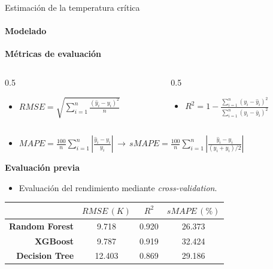 \documentclass{beamer}
\begin{document}
\begin{frame}{\LARGE Estimación de la temperatura crítica}
    \framesubtitle{Modelado}
    \textbf{Métricas de evaluación}
    \begin{columns}[T]
            \begin{column}{0.5\textwidth}
                \begin{itemize}
                    \item $RMSE=\sqrt{\sum_{i=1}^n \frac{(\hat{y}_i-y_i)^2}{n}}$ 
                \end{itemize}
            \end{column}

            \begin{column}{0.5\textwidth}
                \begin{itemize}
                    \item $R^2=1-\frac{\sum_{i=1}^n (y_i-\hat{y}_i)^2}{\sum_{i=1}^n (y_i-\bar{y}_i)^2}$
                \end{itemize}
            \end{column}
    \end{columns}
    \vspace{0.5cm}
    \begin{itemize}
        \item $MAPE=\frac{100}{n} \sum_{i=1}^n \left|\frac{\hat{y}_i-y_i}{y_i}\right| \, \rightarrow \, sMAPE=\frac{100}{n} \sum_{i=1}^n \left|\frac{\hat{y}_i-y_i}{(\hat{y}_i+y_i)/2}\right|$
    \end{itemize}

    \vspace{1cm}

    \textbf{Evaluación previa}
    \begin{itemize}
        \item Evaluación del rendimiento mediante \textit{cross-validation}.
    \end{itemize}
    \begin{table}[H]
        \centering
        \begin{tabular}{r|c|c|c}
                                & \textbf{$RMSE\,(K)$} & \textbf{$R^2$} & \textbf{$sMAPE\,(\%)$} \\ \hline
            \textbf{Random Forest} & 9.718           & 0.920          & 26.373           \\ \hline
            \textbf{XGBoost}       & 9.787           & 0.919          & 32.424           \\ \hline
            \textbf{Decision Tree} & 12.403          & 0.869          & 29.186          
        \end{tabular}
    \end{table}
\end{frame}
\end{document}
